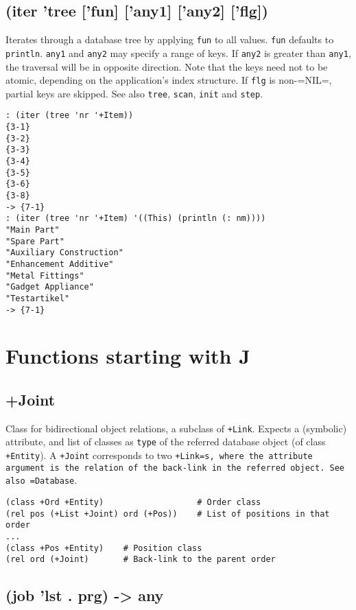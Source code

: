 {{{{{{ 
\section{(iter 'tree ['fun] ['any1] ['any2] ['flg])}
\label{sec-8-1-9-20}


Iterates through a database tree by applying \texttt{fun} to all values. \texttt{fun}
defaults to \texttt{println}. \texttt{any1} and \texttt{any2} may specify a range of keys. If
\texttt{any2} is greater than \texttt{any1}, the traversal will be in opposite
direction. Note that the keys need not to be atomic, depending on the
application's index structure. If \texttt{flg} is non-=NIL=, partial keys are
skipped. See also \texttt{tree}, \texttt{scan}, \texttt{init} and \texttt{step}.


\begin{verbatim}
: (iter (tree 'nr '+Item))
{3-1}
{3-2}
{3-3}
{3-4}
{3-5}
{3-6}
{3-8}
-> {7-1}
: (iter (tree 'nr '+Item) '((This) (println (: nm))))
"Main Part"
"Spare Part"
"Auxiliary Construction"
"Enhancement Additive"
"Metal Fittings"
"Gadget Appliance"
"Testartikel"
-> {7-1}
\end{verbatim}


\chapter{Functions starting with J}
\label{sec-8-1-10}


 
\section{+Joint}
\label{sec-8-1-10-1}


Class for bidirectional object relations, a subclass of \texttt{+Link}. Expects
a (symbolic) attribute, and list of classes as \texttt{type} of the referred
database object (of class \texttt{+Entity}). A \texttt{+Joint} corresponds to two
\texttt{+Link=s, where the attribute argument is the relation of the back-link in the referred object. See also =Database}.


\begin{verbatim}
(class +Ord +Entity)                   # Order class
(rel pos (+List +Joint) ord (+Pos))    # List of positions in that order
...
(class +Pos +Entity)    # Position class
(rel ord (+Joint)       # Back-link to the parent order
\end{verbatim}

 
\section{(job 'lst . prg) -> any}
\label{sec-8-1-10-2}


}}}}}}
